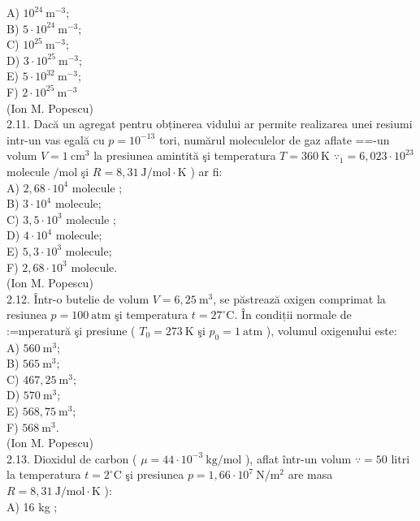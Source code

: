 A) $10^{24} \mathrm{~m}^{-3}$;\\
B) $5 \cdot 10^{24} \mathrm{~m}^{-3}$;\\
C) $10^{25} \mathrm{~m}^{-3}$;\\
D) $3 \cdot 10^{25} \mathrm{~m}^{-3}$;\\
E) $5 \cdot 10^{32} \mathrm{~m}^{-3}$;\\
F) $2 \cdot 10^{25} \mathrm{~m}^{-3}$\\
(Ion M. Popescu)\\
2.11. Dacă un agregat pentru obținerea vidului ar permite realizarea unei resiumi intr-un vas egală cu $p=10^{-13}$ tori, numărul moleculelor de gaz aflate ==-un volum $V=1 \mathrm{~cm}^{3}$ la presiunea amintită şi temperatura $T=360 \mathrm{~K}$ $\because_{1}=6,023 \cdot 10^{23}$ molecule $/ \mathrm{mol}$ şi $R=8,31 \mathrm{~J} / \mathrm{mol} \cdot \mathrm{K}$ ) ar fi:\\
A) $2,68 \cdot 10^{4}$ molecule ;\\
B) $3 \cdot 10^{4}$ molecule;\\
C) $3,5 \cdot 10^{3}$ molecule ;\\
D) $4 \cdot 10^{4}$ molecule;\\
E) $5,3 \cdot 10^{3}$ molecule;\\
F) $2,68 \cdot 10^{3}$ molecule.\\
(Ion M. Popescu)\\
2.12. Într-o butelie de volum $V=6,25 \mathrm{~m}^{3}$, se păstrează oxigen comprimat la resiunea $p=100 \mathrm{~atm}$ şi temperatura $t=27^{\circ} \mathrm{C}$. În condiții normale de :=mperatură şi presiune ( $T_{0}=273 \mathrm{~K}$ şi $p_{0}=1 \mathrm{~atm}$ ), volumul oxigenului este:\\
A) $560 \mathrm{~m}^{3}$;\\
B) $565 \mathrm{~m}^{3}$;\\
C) $467,25 \mathrm{~m}^{3}$;\\
D) $570 \mathrm{~m}^{3}$;\\
E) $568,75 \mathrm{~m}^{3}$;\\
F) $568 \mathrm{~m}^{3}$.\\
(Ion M. Popescu)\\
2.13. Dioxidul de carbon ( $\mu=44 \cdot 10^{-3} \mathrm{~kg} / \mathrm{mol}$ ), aflat într-un volum $\because=50$ litri la temperatura $t=2^{\circ} \mathrm{C}$ şi presiunea $p=1,66 \cdot 10^{7} \mathrm{~N} / \mathrm{m}^{2}$ are masa $R=8,31 \mathrm{~J} / \mathrm{mol} \cdot \mathrm{K}$ ):\\
A) 16 kg ;\\
